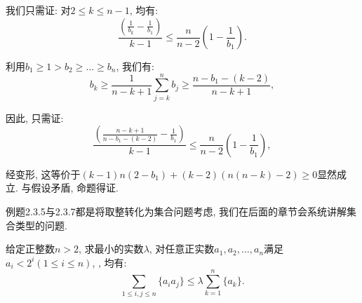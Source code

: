 \documentclass[lang=cn,12pt,thmcnt=section]{elegantbook}
\begin{document}
\begin{solution}
我们只需证: 对$2\le k\le n-1$, 均有: 
\[
\frac{\left(\frac{1}{b_k}-\frac{1}{b_1}\right)}{k-1}\le \frac{n}{n-2}\left(1-\frac{1}{b_1}\right).
\]

利用$b_1\ge 1>b_2\ge \dots{}\ge b_n$, 我们有: 
\[
b_k\ge \frac{1}{n-k+1}\sum_{j=k}^n b_j\ge \frac{n-b_1-(k-2)}{n-k+1}, 
\]

因此, 只需证: 
\[
\frac{\left(\frac{n-k+1}{n-b_1-(k-2)}-\frac{1}{b_1}\right)}{k-1}\le \frac{n}{n-2}\left(1-\frac{1}{b_1}\right),
\]

经变形, 这等价于$(k-1)n(2-b_1)+(k-2)(n(n-k)-2)\ge 0$显然成立. 与假设矛盾, 命题得证.

\end{solution}

例题2.3.5与2.3.7都是将取整转化为集合问题考虑, 我们在后面的章节会系统讲解集合类型的问题. 


\begin{example}
给定正整数$n>2$, 求最小的实数$\lambda$, 对任意正实数$a_1,a_2,\dots{},a_n$满足$a_i<2^i(1\le i\le n)$, , 均有: 
\[
\sum_{1\le i,j\le n}\{a_ia_j\}\le \lambda\sum_{k=1}^n \{a_k\}.
\]
\end{example}
\end{document}
